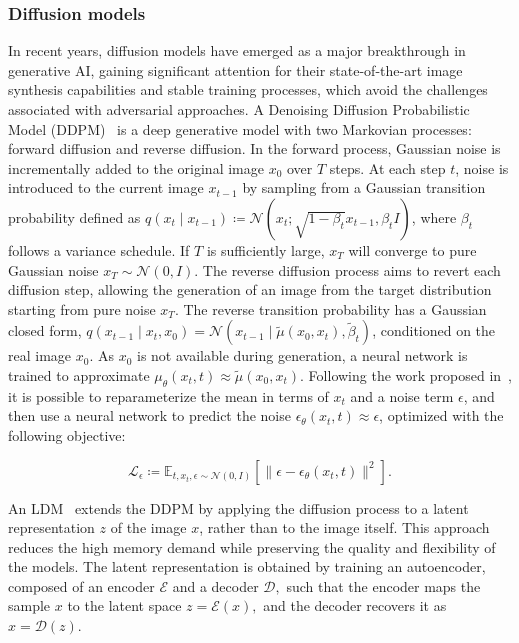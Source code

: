 \subsubsection{Diffusion models}\label{sec:diffusionmodels}
In recent years, diffusion models have emerged as a major breakthrough in generative AI, gaining significant attention for their state-of-the-art image synthesis capabilities and stable training processes, which avoid the challenges associated with adversarial approaches. A Denoising Diffusion Probabilistic Model (DDPM)~\citep{ho2020denoising} is a deep generative model with two Markovian processes: forward diffusion and reverse diffusion. In the forward process, Gaussian noise is incrementally added to the original image $x_0$ over $T$ steps. At each step $t$, noise is introduced to the current image $x_{t-1}$ by sampling from a Gaussian transition probability defined as $q(x_t \mid x_{t-1}) \coloneqq \mathcal{N}(x_t; \sqrt{1 - \beta_t}x_{t-1}, \beta_t I)$, where $\beta_t$ follows a variance schedule. If $T$ is sufficiently large, $x_T$ will converge to pure Gaussian noise $x_T \sim \mathcal{N}(0, I)$. The reverse diffusion process aims to revert each diffusion step, allowing the generation of an image from the target distribution starting from pure noise $x_T$. The reverse transition probability has a Gaussian closed form, $q(x_{t-1} \mid x_t, x_0) = \mathcal{N}(x_{t-1} \mid \tilde\mu(x_0, x_t), \tilde\beta_t)$, conditioned on the real image $x_0$. As $x_0$ is not available during generation, a neural network is trained to approximate $\mu_\theta(x_t, t) \approx \tilde\mu(x_0, x_t)$. Following the work proposed in~\citep{ho2020denoising}, it is possible to reparameterize the mean in terms of $x_t$ and a noise term $\epsilon$, and then use a neural network to predict the noise $\epsilon_\theta(x_t, t) \approx \epsilon$, optimized with the following objective:

\begin{equation}
\mathcal{L}_{\epsilon} \coloneqq \mathbb{E}_{t, x_t, \epsilon \sim \mathcal{N}(0, I)} \left[ 
\lVert \epsilon - \epsilon_\theta(x_t, t) \rVert^2 \right].
\label{eqn:ddpmloss}
\end{equation}

An LDM~\citep{rombach2022high} extends the DDPM by applying the diffusion process to a latent representation $z$ of the image $x$, rather than to the image itself. This approach reduces the high memory demand while preserving the quality and flexibility of the models. The latent representation is obtained by training an autoencoder, composed of an encoder $\mathcal{E}$ and a decoder $\mathcal{D},$ such that the encoder maps the sample $x$ to the latent space $z = \mathcal{E}(x),$ and the decoder recovers it as $x = \mathcal{D}(z)$.

